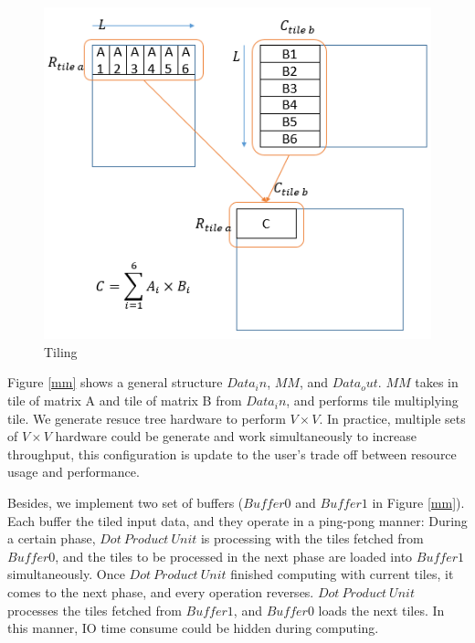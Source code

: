 \documentclass{acm_proc_article-sp-copy}
\begin{document}
\begin{figure}[h]
	\centering
	\includegraphics[width=1.0\linewidth]{figure/z/tile.png}
	\caption{Tiling}
	\label{tile}
\end{figure}

Figure \ref{mm} shows a general structure $Data_in$, $MM$, and $Data_out$. $MM$ takes in tile of matrix A and tile of matrix B from $Data_in$, and performs tile multiplying tile. We generate resuce tree hardware to perform $V\times V$. In practice, multiple sets of $V\times V$ hardware could be generate and work simultaneously to increase throughput, this configuration is update to the user's trade off between resource usage and performance.

Besides, we implement two set of buffers ($Buffer0$ and $Buffer1$ in Figure \ref{mm}). Each buffer the tiled input data, and they operate in a ping-pong manner: During a certain phase, $Dot\ Product\ Unit$ is processing with the tiles fetched from $Buffer0$, and the tiles to be processed in the next phase are loaded into $Buffer1$ simultaneously. Once $Dot\ Product\ Unit$ finished computing with current tiles, it comes to the next phase, and every operation reverses. $Dot\ Product\ Unit$ processes the tiles fetched from $Buffer1$, and $Buffer0$ loads the next tiles. In this manner, IO time consume could be hidden during computing.\\
\end{document}
